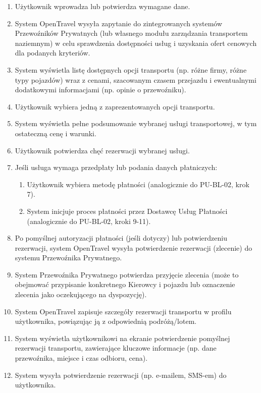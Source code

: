 \documentclass[a4paper,12pt]{article}
\begin{document}
\begin{itemize}
\begin{enumerate}
            \item Użytkownik wprowadza lub potwierdza wymagane dane.
            \item System OpenTravel wysyła zapytanie do zintegrowanych systemów Przewoźników Prywatnych (lub własnego modułu zarządzania transportem naziemnym) w celu sprawdzenia dostępności usług i uzyskania ofert cenowych dla podanych kryteriów.
            \item System wyświetla listę dostępnych opcji transportu (np. różne firmy, różne typy pojazdów) wraz z cenami, szacowanym czasem przejazdu i ewentualnymi dodatkowymi informacjami (np. opinie o przewoźniku).
            \item Użytkownik wybiera jedną z zaprezentowanych opcji transportu.
            \item System wyświetla pełne podsumowanie wybranej usługi transportowej, w tym ostateczną cenę i warunki.
            \item Użytkownik potwierdza chęć rezerwacji wybranej usługi.
            \item Jeśli usługa wymaga przedpłaty lub podania danych płatniczych:
                \begin{enumerate}
                    \item Użytkownik wybiera metodę płatności (analogicznie do PU-BL-02, krok 7).
                    \item System inicjuje proces płatności przez Dostawcę Usług Płatności (analogicznie do PU-BL-02, kroki 9-11).
                \end{enumerate}
            \item Po pomyślnej autoryzacji płatności (jeśli dotyczy) lub potwierdzeniu rezerwacji, system OpenTravel wysyła potwierdzenie rezerwacji (zlecenie) do systemu Przewoźnika Prywatnego.
            \item System Przewoźnika Prywatnego potwierdza przyjęcie zlecenia (może to obejmować przypisanie konkretnego Kierowcy i pojazdu lub oznaczenie zlecenia jako oczekującego na dyspozycję).
            \item System OpenTravel zapisuje szczegóły rezerwacji transportu w profilu użytkownika, powiązując ją z odpowiednią podróżą/lotem.
            \item System wyświetla użytkownikowi na ekranie potwierdzenie pomyślnej rezerwacji transportu, zawierające kluczowe informacje (np. dane przewoźnika, miejsce i czas odbioru, cena).
            \item System wysyła potwierdzenie rezerwacji (np. e-mailem, SMS-em) do użytkownika.

\end{enumerate}
\end{itemize}
\end{document}
